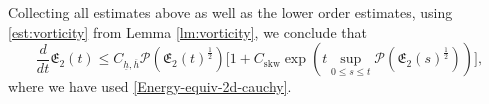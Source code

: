 \documentclass[reqno,11pt]{amsart}
\newcommand{\norm}[2]{\Vert #1 \Vert_{#2}}
\DeclareMathOperator{\curl}{curl}
\theoremstyle{plain}
\theoremstyle{definition}
\numberwithin{equation}{section}
\begin{document}
\smallskip 

Collecting all estimates above as well as the lower order estimates, using \eqref{est:vorticity} from Lemma \ref{lm:vorticity}, we conclude that
\begin{equation}
    \label{energy-ineq-2d-3}
    \frac{d}{dt}\mathfrak{E}_2(t)\leq C_{\underline h,\overline{h}} \mathcal P(\mathfrak{E}_2(t)^{\frac{1}{2}}) \bigl\lbrack 1 + C_\mathrm{skw}
    \exp(t \sup_{0\leq s \leq t} \mathcal P(\mathfrak E_2(s)^{\frac{1}{2}})) \bigr\rbrack,
    \end{equation}
where we have used \eqref{Energy-equiv-2d-cauchy}.
\end{document}
